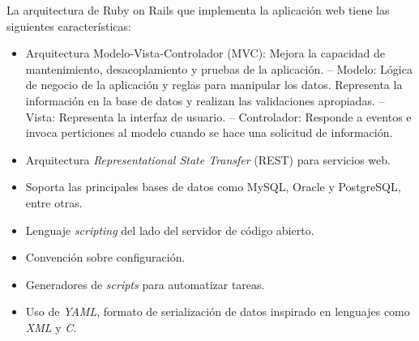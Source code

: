 La arquitectura de Ruby on Rails que implementa la aplicación web tiene las siguientes características:
\begin{itemize}
\item Arquitectura Modelo-Vista-Controlador (MVC): Mejora la capacidad de mantenimiento, desacoplamiento y pruebas de la aplicación.
\subitem-- Modelo: Lógica de negocio de la aplicación y reglas para manipular los datos. Representa la información en la base de datos y realizan las validaciones apropiadas.
\subitem-- Vista: Representa la interfaz de usuario.
\subitem-- Controlador: Responde a eventos e invoca perticiones al modelo cuando se hace una solicitud de información.
\item Arquitectura \textit{Representational State Transfer} (REST) para servicios web.
\item Soporta las principales bases de datos como MySQL, Oracle y PostgreSQL, entre otras.
\item Lenguaje \textit{scripting} del lado del servidor de código abierto.
\item Convención sobre configuración.
\item Generadores de \textit{scripts} para automatizar tareas.
\item Uso de \textit{YAML}, formato de serialización de datos inspirado en lenguajes como \textit{XML} y \textit{C}.
\end{itemize}

